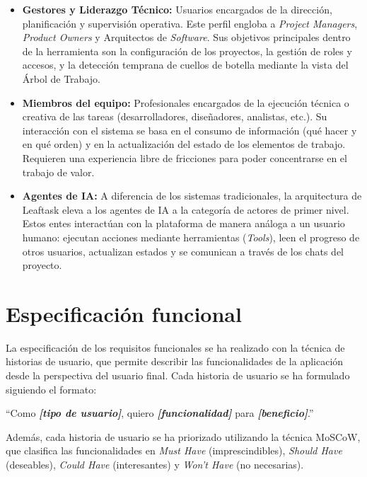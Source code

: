 \begin{itemize}
    \item \textbf{Gestores y Liderazgo Técnico:} Usuarios encargados de la dirección, planificación y supervisión operativa. Este perfil engloba a \emph{Project Managers}, \emph{Product Owners} y Arquitectos de \emph{Software}. Sus objetivos principales dentro de la herramienta son la configuración de los proyectos, la gestión de roles y accesos, y la detección temprana de cuellos de botella mediante la vista del Árbol de Trabajo.
    
    \item \textbf{Miembros del equipo:} Profesionales encargados de la ejecución técnica o creativa de las tareas (desarrolladores, diseñadores, analistas, etc.). Su interacción con el sistema se basa en el consumo de información (qué hacer y en qué orden) y en la actualización del estado de los elementos de trabajo. Requieren una experiencia libre de fricciones para poder concentrarse en el trabajo de valor.
    
    \item \textbf{Agentes de \ac{IA}:} A diferencia de los sistemas tradicionales, la arquitectura de Leaftask eleva a los agentes de IA a la categoría de actores de primer nivel. Estos entes interactúan con la plataforma de manera análoga a un usuario humano: ejecutan acciones mediante herramientas (\emph{Tools}), leen el progreso de otros usuarios, actualizan estados y se comunican a través de los chats del proyecto.
\end{itemize}

\section{Especificación funcional}
La especificación de los requisitos funcionales se ha realizado con la técnica de historias de usuario, que permite describir las funcionalidades de la aplicación desde la perspectiva del usuario final. Cada historia de usuario se ha formulado siguiendo el formato:
\begin{center}
``Como \textbf{\textit{[tipo de usuario]}}, quiero \textbf{\textit{[funcionalidad]}} para \textbf{\textit{[beneficio]}}.''
\end{center}

Además, cada historia de usuario se ha priorizado utilizando la técnica MoSCoW, que clasifica las funcionalidades en \emph{Must Have} (imprescindibles), \emph{Should Have} (deseables), \emph{Could Have} (interesantes) y \emph{Won't Have} (no necesarias).


